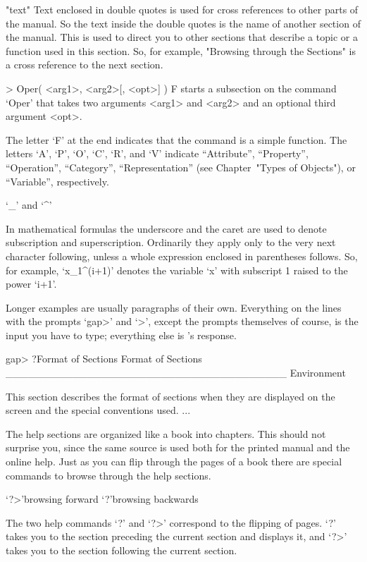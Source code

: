 \begintt
"text"
\endtt
Text enclosed in double quotes is used for cross references to other
parts of the manual. So the text inside the double quotes is the name of
another section of the manual. This is used to direct you to other
sections that describe a topic or a function used in this section. So, 
for example, "Browsing through the Sections" is a cross reference to the next
section.

\begintt
> Oper( <arg1>, <arg2>[, <opt>] ) F
\endtt
starts a subsection on the command `Oper' that takes two arguments <arg1>
and <arg2> and an optional third argument <opt>.

The letter `F' at the end
indicates that the command is a simple function.
The letters `A', `P', `O', `C', `R', and `V' indicate
``Attribute'', ``Property'', ``Operation'', ``Category'', ``Representation''
(see Chapter~"Types of Objects"), or ``Variable'', respectively.

`_' and `^'

In mathematical formulas the underscore and the caret are used to denote
subscription and superscription. Ordinarily they apply only to the very
next character following, unless a whole expression enclosed in
parentheses follows. So, for example, `x_1^(i+1)' denotes the variable `x'
with subscript 1 raised to the power `i+1'.

Longer examples are usually paragraphs of their own.
Everything on the lines with the prompts `gap>' and `>', except
the prompts themselves of course, is the input you have to type;
everything else is {\GAP}'s response.

\begintt
gap> ?Format of Sections
Format of Sections ______________________________________ Environment

This section describes the format of sections when they are displayed
on the screen and the special conventions used.
... 
\endtt


The help sections are organized like a book into chapters. This should
not surprise you, since the same source is used both for the printed
manual and the online help. Just as you can flip through the pages of a
book there are special commands to browse through the help sections.

\>`?>'{browsing forward}
\>`?\<'{browsing backwards}

The two help commands `?\<' and `?>' correspond to the flipping of pages.
`?\<' takes you to the section preceding the current section and displays
it, and `?>' takes you to the section following the current section.


